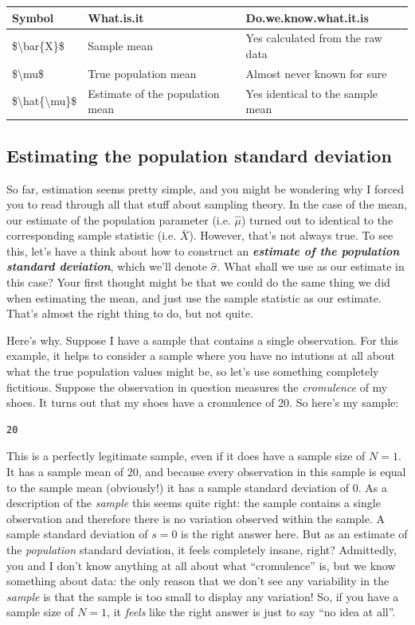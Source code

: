 \documentclass[spanish,]{book}
\begin{document}
\begin{tabular}{l|l|l}
\hline
Symbol & What.is.it & Do.we.know.what.it.is\\
\hline
\$\textbackslash{}bar\{X\}\$ & Sample mean & Yes  calculated from the raw data\\
\hline
\$\textbackslash{}mu\$ & True population mean & Almost never known for sure\\
\hline
\$\textbackslash{}hat\{\textbackslash{}mu\}\$ & Estimate of the population mean & Yes  identical to the sample mean\\
\hline
\end{tabular}

\subsection{Estimating the population standard
deviation}\label{estimating-the-population-standard-deviation}

So far, estimation seems pretty simple, and you might be wondering why I
forced you to read through all that stuff about sampling theory. In the
case of the mean, our estimate of the population parameter (i.e.
\(\hat\mu\)) turned out to identical to the corresponding sample
statistic (i.e. \(\bar{X}\)). However, that's not always true. To see
this, let's have a think about how to construct an
\textbf{\emph{estimate of the population standard deviation}}, which
we'll denote \(\hat\sigma\). What shall we use as our estimate in this
case? Your first thought might be that we could do the same thing we did
when estimating the mean, and just use the sample statistic as our
estimate. That's almost the right thing to do, but not quite.

Here's why. Suppose I have a sample that contains a single observation.
For this example, it helps to consider a sample where you have no
intutions at all about what the true population values might be, so
let's use something completely fictitious. Suppose the observation in
question measures the \emph{cromulence} of my shoes. It turns out that
my shoes have a cromulence of 20. So here's my sample:

\begin{verbatim}
20
\end{verbatim}

This is a perfectly legitimate sample, even if it does have a sample
size of \(N=1\). It has a sample mean of 20, and because every
observation in this sample is equal to the sample mean (obviously!) it
has a sample standard deviation of 0. As a description of the
\emph{sample} this seems quite right: the sample contains a single
observation and therefore there is no variation observed within the
sample. A sample standard deviation of \(s = 0\) is the right answer
here. But as an estimate of the \emph{population} standard deviation, it
feels completely insane, right? Admittedly, you and I don't know
anything at all about what ``cromulence'' is, but we know something
about data: the only reason that we don't see any variability in the
\emph{sample} is that the sample is too small to display any variation!
So, if you have a sample size of \(N=1\), it \emph{feels} like the right
answer is just to say ``no idea at all''.
\end{document}
